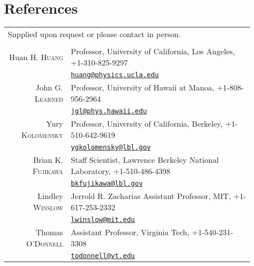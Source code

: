 \documentclass[10pt]{article} %
\begin{document}
\clearpage
\section{References}

\noindent\begin{tabular}{rp{12cm}}
\multicolumn{2}{l}{\footnotesize{Supplied upon request or please contact in
	person.}}\\
\multicolumn{2}{c}{}\\
Huan H. \textsc{Huang} & Professor, University of California, Los Angeles, +1-310-825-9297\\
& \href{mailto:huang@physics.ucla.edu}{\nolinkurl{huang@physics.ucla.edu}}\\
John G. \textsc{Learned} & Professor, University of Hawaii at Manoa, +1-808-956-2964\\
& \href{mailto:jgl@phys.hawaii.edu}{\nolinkurl{jgl@phys.hawaii.edu}}\\
Yury \textsc{Kolomensky} & Professor, University of California, Berkeley, +1-510-642-9619\\
& \href{mailto:ygkolomensky@lbl.gov}{\nolinkurl{ygkolomensky@lbl.gov}}\\
Brian K. \textsc{Fujikawa} & Staff Scientist, Lawrence Berkeley National Laboratory, +1-510-486-4398\\
& \href{mailto:bkfujikawa@lbl.gov}{\nolinkurl{bkfujikawa@lbl.gov}}\\
Lindley \textsc{Winslow} & Jerrold R. Zacharias Assistant Professor, MIT, +1-617-253-2332\\
& \href{mailto:lwinslow@mit.edu}{\nolinkurl{lwinslow@mit.edu}}\\ 
Thomas \textsc{O'Donnell} & Assistant Professor, Virginia Tech, +1-540-231-3308\\
& \href{mailto:todonnell@vt.edu}{\nolinkurl{todonnell@vt.edu}}\\

%
%

\end{tabular}

\end{document}
